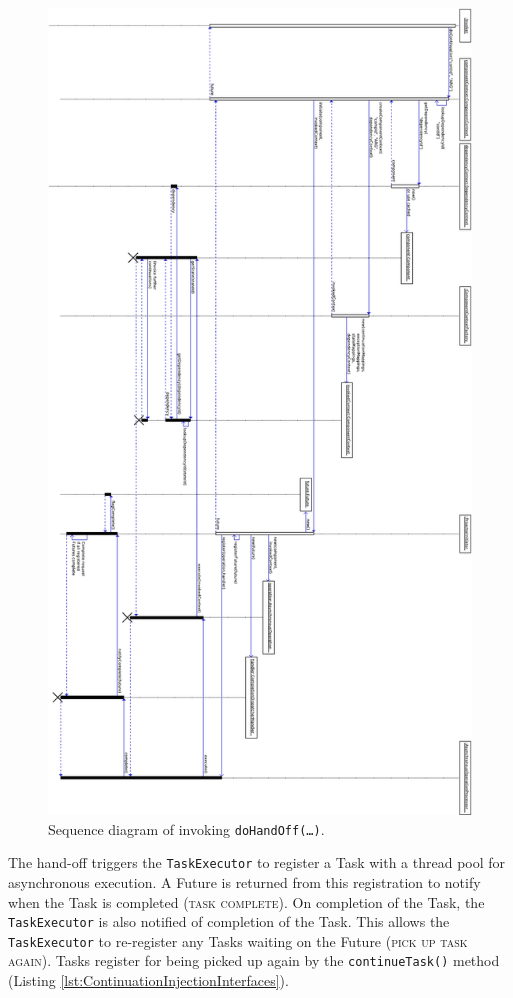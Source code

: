 \documentclass[prodmode]{style/acmlarge}
\begin{document}
\begin{figure}[!t]
\centering
\includegraphics[width=6in]{DoContinuationSequenceDiagram}
\caption{Sequence diagram of invoking \texttt{doHandOff(\ldots)}.}
\label{fig:DoContinuationSequenceDiagram}
\end{figure}

The hand-off triggers the \texttt{TaskExecutor} to register a Task with a thread
pool for asynchronous execution.  A Future is returned from this registration to
notify when the Task is completed (\textsc{task complete}).  On completion of
the Task, the \texttt{TaskExecutor} is also notified of completion of the Task.
This allows the \texttt{TaskExecutor} to re-register any Tasks waiting on the
Future (\textsc{pick up task again}).  Tasks register for being picked up again
by the \texttt{continueTask()} method (Listing
\ref{lst:ContinuationInjectionInterfaces}).
\end{document}
